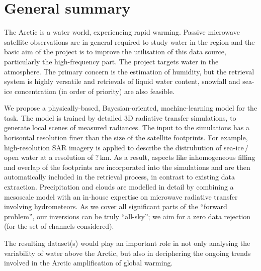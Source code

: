 \documentclass[12pt,oneside,a4paper]{article}
\begin{document}
	
	
	\thispagestyle{empty}
	\vspace*{-10mm}
	\noindent
	\textbf{\Large \LongTitle}




\section{General summary}
%
The Arctic is a water world, experiencing rapid warming. Passive microwave 
satellite observations are in general required to study water in the region and
the basic aim of the project is to improve the utilisation of this data source,
particularly the high-frequency part. The project targets water in the
atmosphere. The primary concern is the estimation of humidity, but the retrieval
system is highly versatile and retrievals of liquid water content, snowfall and
sea-ice concentration (in order of priority) are also feasible.

We propose a physically-based, Bayesian-oriented, machine-learning model for
the task. The model is trained by detailed 3D radiative transfer simulations,
to generate local scenes of measured radiances. The input to the simulations
has a horisontal resolution finer than the size of the satellite footprints.
For example, high-resolution SAR imagery is applied to describe the
distrubution of sea-ice\,/\,open water at a resolution of ?\,km. As a result,
aspects like inhomogeneous filling and overlap of the footprints are
incorporated into the simulations and are then automatically included in the
retrieval process, in contrast to existing data extraction. Precipitation and
clouds are modelled in detail by combining a mesoscale model with an in-house
expertise on microwave radiative transfer involving hydrometeors. As we cover
all significant parts of the ``forward problem'', our inversions can be truly
``all-sky''; we aim for a zero data rejection (for the set of channels
considered).

The resulting dataset(s) would play an important role in not only analysing the
variability of water above the Arctic, but also in deciphering the
ongoing trends involved in the Arctic amplification of global warming.
\end{document}
